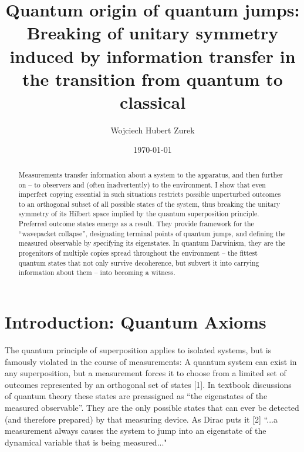 \documentclass[aps,twocolumn,pra,onecolumn,12pt]{revtex4}
\newcommand{\+}         {\dagger}
\begin{document}
\title{Quantum origin of quantum jumps: Breaking of unitary symmetry induced by information transfer in the transition from quantum to classical }
\author{Wojciech Hubert Zurek}

 \address{Theory Division, MS B213, LANL
    Los Alamos, NM, 87545, U.S.A.}

\date{\today}

\begin{abstract}
Measurements transfer information about a system to the apparatus, and then further on -- to observers 
and (often inadvertently) to the environment. I show that even imperfect copying essential in such 
situations restricts possible unperturbed outcomes to an orthogonal subset of all possible states 
of the system, thus breaking the unitary symmetry of its Hilbert space implied by the quantum superposition principle. Preferred outcome states emerge as a result. They provide framework 
for the ``wavepacket collapse'', designating terminal points of quantum jumps, and defining the
measured observable by specifying its eigenstates. In quantum Darwinism, they are the progenitors of multiple copies spread throughout the environment -- the fittest quantum states that not only survive 
decoherence, but subvert it into carrying information about them -- into becoming a witness.

\end{abstract}

\maketitle

\section{Introduction: Quantum Axioms}
The quantum principle of superposition applies to isolated systems, but is famously violated 
in the course of measurements: A quantum system can exist in any superposition, but a measurement 
forces it to choose from a limited set of outcomes represented by an orthogonal set of states [1]. 
In textbook discussions of quantum theory these states are preassigned as ``the eigenstates of the measured observable''. They are the only possible states that can ever be detected (and therefore 
prepared) by that measuring device. As Dirac puts it [2]  ``...a measurement always causes 
the system to jump into an eigenstate of the dynamical variable that is being measured..." 
\end{document}
